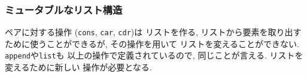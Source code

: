 \subsubsection{ミュータブルなリスト構造}
ペアに対する操作 (\lstinline{cons}, \lstinline{car}, \lstinline{cdr})は
リストを作る, リストから要素を取り出すために使うことができるが, その操作を用いて
リストを変えることができない. \lstinline{append}や\lstinline{list}も
以上の操作で定義されているので, 同じことが言える. リストを変えるために新しい
操作が必要となる.